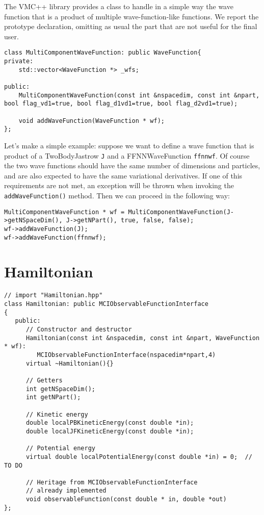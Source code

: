 \documentclass[11pt,a4paper,twoside]{article}
\begin{document}
The VMC++ library provides a class to handle in a simple way the wave function that is a product of multiple wave-function-like functions.
We report the prototype declaration, omitting as usual the part that are not useful for the final user.

\begin{lstlisting}
class MultiComponentWaveFunction: public WaveFunction{
private:
    std::vector<WaveFunction *> _wfs;

public:
    MultiComponentWaveFunction(const int &nspacedim, const int &npart, bool flag_vd1=true, bool flag_d1vd1=true, bool flag_d2vd1=true);

    void addWaveFunction(WaveFunction * wf);
};
\end{lstlisting}

Let's make a simple example: suppose we want to define a wave function that is product of a TwoBodyJastrow \verb+J+ and a FFNNWaveFunction \verb+ffnnwf+.
Of course the two wave functions should have the same number of dimensions and particles, and are also expected to have the same variational derivatives.
If one of this requirements are not met, an exception will be thrown when invoking the \verb+addWaveFunction()+ method.
Then we can proceed in the following way:

\begin{lstlisting}
MultiComponentWaveFunction * wf = MultiComponentWaveFunction(J->getNSpaceDim(), J->getNPart(), true, false, false);
wf->addWaveFunction(J);
wf->addWaveFunction(ffnnwf);
\end{lstlisting}









\section{Hamiltonian} %
\label{sec:hamiltonian}

\begin{lstlisting}
// import "Hamiltonian.hpp"
class Hamiltonian: public MCIObservableFunctionInterface
{
   public:
      // Constructor and destructor
      Hamiltonian(const int &nspacedim, const int &npart, WaveFunction * wf):
         MCIObservableFunctionInterface(nspacedim*npart,4)
      virtual ~Hamiltonian(){}

      // Getters
      int getNSpaceDim();
      int getNPart();

      // Kinetic energy
      double localPBKineticEnergy(const double *in);
      double localJFKineticEnergy(const double *in);

      // Potential energy
      virtual double localPotentialEnergy(const double *in) = 0;  // TO DO

      // Heritage from MCIObservableFunctionInterface
      // already implemented
      void observableFunction(const double * in, double *out)
};
\end{lstlisting}
\end{document}
